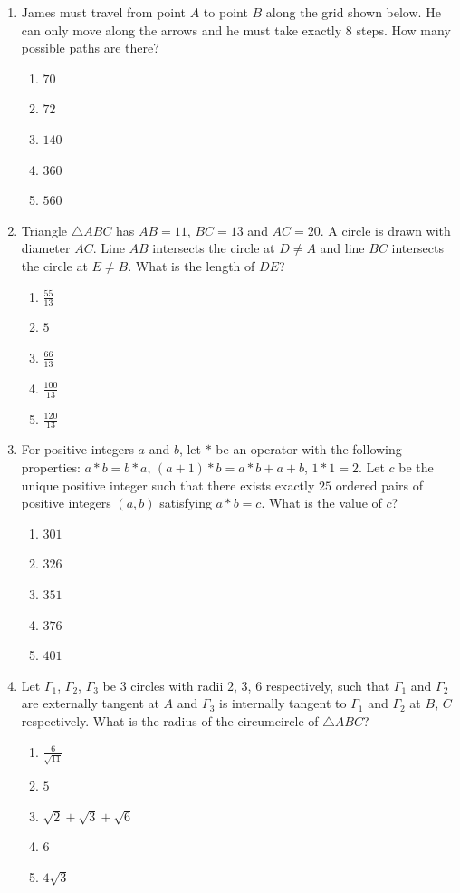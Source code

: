 \documentclass{article}
\begin{document}
\begin{enumerate}
\item James must travel from point $A$ to point $B$ along the grid shown below. He can only move along the arrows and he must take exactly $8$ steps. How many possible paths are there?
\begin{enumerate}
    \item $70$
    \item $72$
    \item $140$
    \item $360$
    \item $560$
\end{enumerate}

\item Triangle $\triangle ABC$ has $AB=11$, $BC=13$ and $AC=20$. A circle is drawn with diameter $AC$. Line $AB$ intersects the circle at $D\ne A$ and line $BC$ intersects the circle at $E\ne B$. What is the length of $DE$?
\begin{enumerate}
    \item $\frac{55}{13}$
    \item $5$
    \item $\frac{66}{13}$
    \item $\frac{100}{13}$
    \item $\frac{120}{13}$
\end{enumerate}

\item For positive integers $a$ and $b$, let $*$ be an operator with the following properties: $a*b=b*a$, $(a+1)*b=a*b+a+b$, $1*1=2$. Let $c$ be the unique positive integer such that there exists exactly $25$ ordered pairs of positive integers $(a, b)$ satisfying $a*b=c$. What is the value of $c$?
\begin{enumerate}
    \item $301$
    \item $326$
    \item $351$
    \item $376$
    \item $401$
\end{enumerate}

\item Let $\Gamma_{1}$, $\Gamma_{2}$, $\Gamma_{3}$ be $3$ circles with radii $2$, $3$, $6$ respectively, such that $\Gamma_{1}$ and $\Gamma_{2}$ are externally tangent at $A$ and $\Gamma_{3}$ is internally tangent to $\Gamma_{1}$ and $\Gamma_{2}$ at $B$, $C$ respectively. What is the radius of the circumcircle of $\triangle ABC$?
\begin{enumerate}
    \item $\frac{6}{\sqrt{11}}$
    \item $5$
    \item $\sqrt{2}+\sqrt{3}+\sqrt{6}$
    \item $6$
    \item $4\sqrt{3}$
\end{enumerate}


\end{enumerate}
\end{document}
